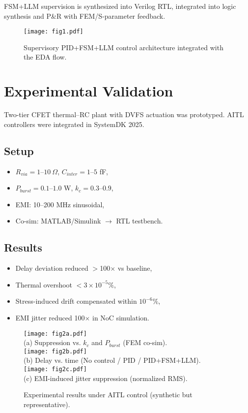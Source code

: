 \documentclass[conference]{IEEEtran}
\begin{document}
FSM+LLM supervision is synthesized into Verilog RTL, integrated into logic synthesis and P\&R with FEM/S-parameter feedback.

\begin{figure}[t]
    \centering
    \texttt{[image: fig1.pdf]}
    \caption{Supervisory PID+FSM+LLM control architecture integrated with the EDA flow.}
\end{figure}

\section{Experimental Validation}
Two-tier CFET thermal–RC plant with DVFS actuation was prototyped.  
AITL controllers were integrated in SystemDK 2025.

\subsection{Setup}
\begin{itemize}
    \item $R_{via}=1$–$10~\Omega$, $C_{inter}=1$–$5$ fF,
    \item $P_{burst}=0.1$–$1.0$ W, $k_c=0.3$–$0.9$,
    \item EMI: 10–200 MHz sinusoidal,
    \item Co-sim: MATLAB/Simulink $\rightarrow$ RTL testbench.
\end{itemize}

\subsection{Results}
\begin{itemize}
    \item Delay deviation reduced $>$100$\times$ vs baseline,
    \item Thermal overshoot $<3 \times 10^{-5}\%$,
    \item Stress-induced drift compensated within $10^{-6}\%$,
    \item EMI jitter reduced 100$\times$ in NoC simulation.
\end{itemize}

\begin{figure}[t]
  \centering
  \texttt{[image: fig2a.pdf]}\\[10pt]
  (a) Suppression vs. $k_c$ and $P_{burst}$ (FEM co-sim).\\[15pt]

  \texttt{[image: fig2b.pdf]}\\[10pt]
  (b) Delay vs. time (No control / PID / PID+FSM+LLM).\\[15pt]

  \texttt{[image: fig2c.pdf]}\\
  (c) EMI-induced jitter suppression (normalized RMS).

  \caption{Experimental results under AITL control (synthetic but representative).}
\end{figure}
\end{document}
